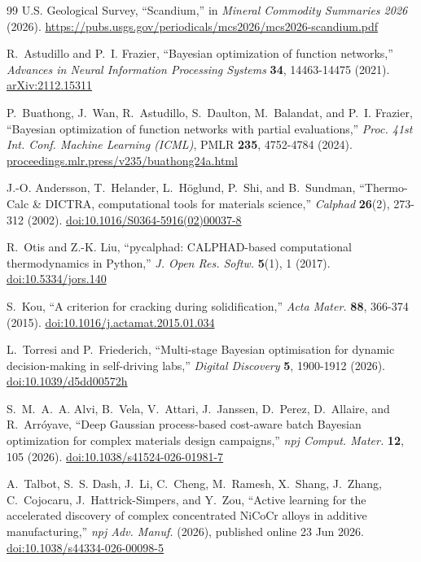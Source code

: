 \documentclass[12pt,letterpaper]{article}
\begin{document}
\begin{thebibliography}{99}
U.S. Geological Survey, ``Scandium,'' in \emph{Mineral Commodity Summaries
2026} (2026).
\url{https://pubs.usgs.gov/periodicals/mcs2026/mcs2026-scandium.pdf}

R.~Astudillo and P.~I. Frazier, ``Bayesian optimization of function
networks,'' \emph{Advances in Neural Information Processing Systems}
\textbf{34}, 14463-14475 (2021).
\href{https://arxiv.org/abs/2112.15311}{arXiv:2112.15311}

P.~Buathong, J.~Wan, R.~Astudillo, S.~Daulton, M.~Balandat, and P.~I.
Frazier, ``Bayesian optimization of function networks with partial
evaluations,'' \emph{Proc. 41st Int. Conf. Machine Learning (ICML)}, PMLR
\textbf{235}, 4752-4784 (2024).
\href{https://proceedings.mlr.press/v235/buathong24a.html}{proceedings.mlr.press/v235/buathong24a.html}

J.-O. Andersson, T.~Helander, L.~H{\"o}glund, P.~Shi, and B.~Sundman,
``Thermo-Calc \& DICTRA, computational tools for materials science,''
\emph{Calphad} \textbf{26}(2), 273-312 (2002).
\href{https://doi.org/10.1016/S0364-5916(02)00037-8}{doi:10.1016/S0364-5916(02)00037-8}

R.~Otis and Z.-K. Liu, ``pycalphad: CALPHAD-based computational
thermodynamics in Python,'' \emph{J. Open Res. Softw.} \textbf{5}(1), 1
(2017). \href{https://doi.org/10.5334/jors.140}{doi:10.5334/jors.140}

S.~Kou, ``A criterion for cracking during solidification,''
\emph{Acta Mater.} \textbf{88}, 366-374 (2015).
\href{https://doi.org/10.1016/j.actamat.2015.01.034}{doi:10.1016/j.actamat.2015.01.034}

L.~Torresi and P.~Friederich, ``Multi-stage Bayesian optimisation for dynamic
decision-making in self-driving labs,'' \emph{Digital Discovery} \textbf{5},
1900-1912 (2026).
\href{https://doi.org/10.1039/d5dd00572h}{doi:10.1039/d5dd00572h}

S.~M.~A.~A. Alvi, B.~Vela, V.~Attari, J.~Janssen, D.~Perez, D.~Allaire, and
R.~Arr{\'o}yave, ``Deep Gaussian process-based cost-aware batch Bayesian
optimization for complex materials design campaigns,'' \emph{npj Comput.
Mater.} \textbf{12}, 105 (2026).
\href{https://doi.org/10.1038/s41524-026-01981-7}{doi:10.1038/s41524-026-01981-7}

A.~Talbot, S.~S. Dash, J.~Li, C.~Cheng, M.~Ramesh, X.~Shang, J.~Zhang,
C.~Cojocaru, J.~Hattrick-Simpers, and Y.~Zou, ``Active learning for the
accelerated discovery of complex concentrated NiCoCr alloys in additive
manufacturing,'' \emph{npj Adv. Manuf.} (2026), published online 23 Jun 2026.
\href{https://doi.org/10.1038/s44334-026-00098-5}{doi:10.1038/s44334-026-00098-5}


\end{thebibliography}
\end{document}
